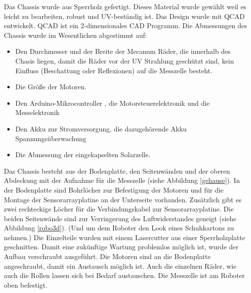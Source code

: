 \documentclass[a4paper,bibtotoc,oneside]{scrbook}
\begin{document}
\noindent Das Chassis wurde aus Sperrholz gefertigt. Dieses Material wurde gewählt weil es leicht zu bearbeiten, robust und UV-beständig ist. Das Design wurde mit QCAD entwickelt. QCAD ist ein 2-dimensionales CAD Programm. 
Die Abmessungen des Chassis wurde im Wesentlichen abgestimmt auf: \begin{itemize}
\item Den Durchmesser und der Breite der Mecanum Räder, die innerhalb des Chasis liegen, damit die Räder vor der UV Strahlung geschützt sind, kein Einfluss (Beschattung oder Reflexionen) auf die Messzelle besteht.
\item Die Größe der Motoren.
\item Den Arduino-Mikrocontroller , die Motorsteuerelektronik und die Messelektronik
\item Den Akku zur Stromversorgung, die dazugehörende Akku Spannungsüberwachung 
\item Die Abmessung der eingekapselten Solarzelle.
 \end{itemize}

Das Chassis besteht aus der Bodenplatte, den Seitenwänden und der oberen Abdeckung mit der Aufnahme für die Messzelle (siehe Abbildung \ref{gehause}). In der Bodenplatte sind Bohrlöcher zur Befestigung der Motoren und für die Montage der Sensorarrayplatine an der Unterseite vorhanden. Zusätzlich gibt es zwei rechteckige Löcher für die Verbindungskabel zur Sensorarrayplatine. Die beiden Seitenwände sind zur Verringerung des Luftwiderstandes geneigt (siehe Abbildung \ref{robo3d}). (Und um dem Roboter den Look eines Schuhkartons zu nehmen.)
\noindent Die Einzelteile wurden mit einem Lasercutter aus einer Sperrholzplatte geschnitten. Damit eine zukünftige Wartung problemlos möglich ist, wurde der Aufbau verschraubt ausgeführt. 
Die Motoren sind an die Bodenplatte angeschraubt, damit ein Austausch möglich ist. Auch die einzelnen Räder, wie auch die Rollen lassen sich bei Bedarf austauschen. 
Die Messzelle ist am Roboter oben befestigt.
\end{document}
